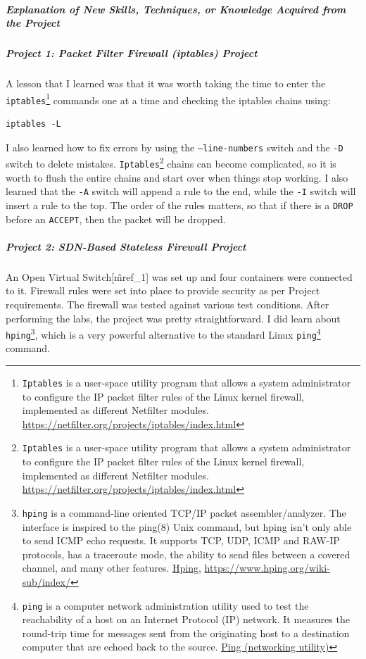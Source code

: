\subparagraph{Explanation of New Skills, Techniques, or Knowledge Acquired from the Project}

\subparagraph{Project 1: Packet Filter Firewall (iptables) Project}

A lesson that I learned was that it was worth taking the time to enter the \texttt{iptables}\footnote{\texttt{Iptables} is a user-space utility program that allows a system administrator to configure the IP packet filter rules of the Linux kernel firewall, implemented as different Netfilter modules. \href{https://netfilter.org/projects/iptables/index.html}{https://netfilter.org/projects/iptables/index.html}} commands one at a time and checking the iptables chains using:

\begin{verbatim}
iptables -L
\end{verbatim}

I also learned how to fix errors by using the \texttt{--line-numbers} switch and the \texttt{-D} switch to delete mistakes.  \texttt{Iptables}\footnote{\texttt{Iptables} is a user-space utility program that allows a system administrator to configure the IP packet filter rules of the Linux kernel firewall, implemented as different Netfilter modules. \href{https://netfilter.org/projects/iptables/index.html}{https://netfilter.org/projects/iptables/index.html}} chains can become complicated, so it is worth to flush the entire chains and start over when things stop working.  I also learned that the \texttt{-A} switch will append a rule to the end, while the \texttt{-I} switch will insert a rule to the top.  The order of the rules matters, so that if there is a \texttt{DROP} before an \texttt{ACCEPT}, then the packet will be dropped.

\subparagraph{Project 2: SDN-Based Stateless Firewall Project}

An Open Virtual Switch[\^mref\_1] was set up and four containers were connected to it.  Firewall rules were set into place to provide security as per Project requirements.  The firewall was tested against various test conditions.  After performing the labs, the project was pretty straightforward.  I did learn about \texttt{hping}\footnote{\texttt{hping} is a command-line oriented TCP/IP packet assembler/analyzer. The interface is inspired to the ping(8) Unix command, but hping isn't only able to send ICMP echo requests. It supports TCP, UDP, ICMP and RAW-IP protocols, has a traceroute mode, the ability to send files between a covered channel, and many other features. \href{https://en.wikipedia.org/wiki/Hping}{Hping}, \href{https://www.hping.org/wiki-sub/index/}{https://www.hping.org/wiki-sub/index/}}, which is a very powerful alternative to the standard Linux \texttt{ping}\footnote{\texttt{ping} is a computer network administration utility used to test the reachability of a host on an Internet Protocol (IP) network. It measures the round-trip time for messages sent from the originating host to a destination computer that are echoed back to the source. \href{https://en.wikipedia.org/wiki/Ping\_(networking\_utility)}{Ping (networking utility)}} command.

